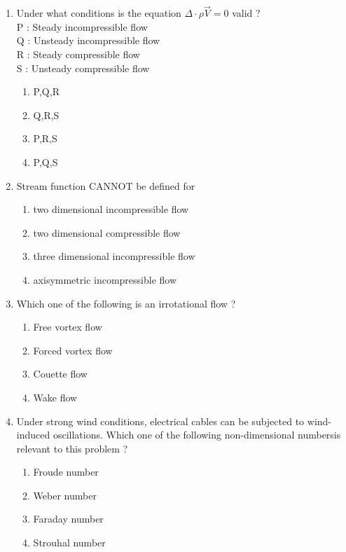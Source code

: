 \documentclass[journal]{IEEEtran}
\begin{document}
\begin{enumerate}
\item Under what conditions is the equation $\Delta \cdot \rho \overrightarrow{V} = 0$ valid ?\\
P : Steady incompressible flow \\
Q : Unsteady incompressible flow \\
R : Steady compressible flow \\
S : Unsteady compressible flow 
    \begin{enumerate}
        \item P,Q,R
        \item Q,R,S
        \item P,R,S
        \item P,Q,S \\
    \end{enumerate}
\item Stream function CANNOT be defined for
\begin{enumerate}
    \item two dimensional incompressible flow
    \item two dimensional compressible flow
    \item three dimensional incompressible flow
    \item axisymmetric incompressible flow \\
\end{enumerate}
\item Which one of the following is an irrotational flow ?
\begin{enumerate}
    \item Free vortex flow
    \item Forced vortex flow
    \item Couette flow
    \item Wake flow \\
\end{enumerate}
\item Under strong wind conditions, electrical cables can be subjected to wind-induced oscillations. Which one of the following non-dimensional numbersis relevant to this problem ?
 \begin{enumerate}
     \item Froude number
     \item Weber number
     \item Faraday number
     \item Strouhal number \\
 \end{enumerate}

\end{enumerate}
\end{document}
